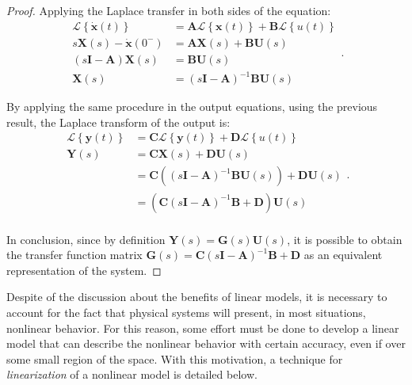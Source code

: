 \documentclass[a4paper,11pt]{book}
\numberwithin{figure}{chapter}
\numberwithin{equation}{chapter}
\numberwithin{table}{chapter}
\theoremstyle{definition}
\begin{document}
\begin{proof}
    Applying the Laplace transfer in both sides of the equation:
    \begin{equation} \label{eq:convertSSIO01}
    \begin{split}
        \mathcal{L} \left\{ \dot{\bm{x}}(t) \right\} &= \bm{A} \mathcal{L} \left\{ \bm{x}(t) \right\} + \bm{B} \mathcal{L} \left\{ u(t) \right\} \\
        s \bm{X}(s) - \dot{\bm{x}}(0^-) &= \bm{A} \bm{X}(s) + \bm{B} \bm{U}(s) \\
        (s\bm{I}  - \bm{A}) \bm{X}(s) &=  \bm{B} \bm{U}(s) \\
         \bm{X}(s) &= (s\bm{I}  - \bm{A})^{-1} \bm{B} \bm{U}(s)
    \end{split}
    .\end{equation}
    
    By applying the same procedure in the output equations, using the previous result, the Laplace transform of the output is:
    \begin{equation} \label{eq:convertSSIO02}
    \begin{split}
        \mathcal{L} \left\{ \bm{y}(t) \right\} &= \bm{C} \mathcal{L} \left\{ \bm{y}(t) \right\} + \bm{D} \mathcal{L} \left\{ u(t) \right\} \\
        \bm{Y}(s)  &= \bm{C} \bm{X}(s) + \bm{D} \bm{U}(s) \\
          &= \bm{C} \left( (s\bm{I}  - \bm{A})^{-1} \bm{B} \bm{U}(s) \right) + \bm{D} \bm{U}(s) \\
          &= \left( \bm{C} (s\bm{I} - \bm{A})^{-1} \bm{B}   + \bm{D} \right) \bm{U}(s) \\
    \end{split}
    .\end{equation}
    
    In conclusion, since by definition $\bm{Y}(s) = \bm{G}(s) \bm{U}(s)$, it is possible to obtain the transfer function matrix $\bm{G}(s) = \bm{C} (s\bm{I} - \bm{A})^{-1} \bm{B} + \bm{D}$ as an equivalent representation of the system.
\end{proof}

Despite of the discussion about the benefits of linear models, it is necessary to account for the fact that physical systems will present, in most situations, nonlinear behavior. For this reason, some effort must be done to develop a linear model that can describe the nonlinear behavior with certain accuracy, even if over some small region of the space. With this motivation, a technique for \textit{linearization} of a nonlinear model is detailed below.
\end{document}
